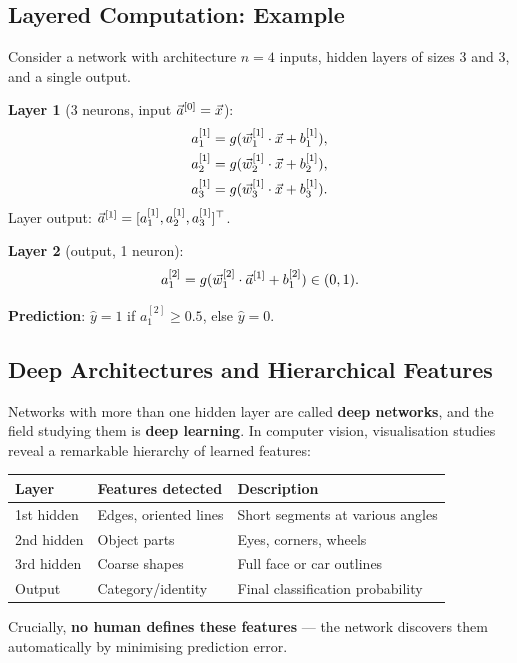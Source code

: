 \subsection{Layered Computation: Example}

Consider a network with architecture $n=4$ inputs, hidden layers of sizes 3
and 3, and a single output.

\textbf{Layer 1} (3 neurons, input $\vec{a}^{[0]}=\vec{x}$):
\begin{align*}
a_1^{[1]}&=g(\vec{w}_1^{[1]}\cdot\vec{x}+b_1^{[1]}),\\
a_2^{[1]}&=g(\vec{w}_2^{[1]}\cdot\vec{x}+b_2^{[1]}),\\
a_3^{[1]}&=g(\vec{w}_3^{[1]}\cdot\vec{x}+b_3^{[1]}).
\end{align*}
Layer output: $\vec{a}^{[1]}=[a_1^{[1]},a_2^{[1]},a_3^{[1]}]^{\top}$.

\textbf{Layer 2} (output, 1 neuron):
\[a_1^{[2]}=g(\vec{w}_1^{[2]}\cdot\vec{a}^{[1]}+b_1^{[2]})\in(0,1).\]

\textbf{Prediction}: $\hat{y}=1$ if $a_1^{[2]}\ge 0.5$, else $\hat{y}=0$.

\subsection{Deep Architectures and Hierarchical Features}

Networks with more than one hidden layer are called \textbf{deep networks},
and the field studying them is \textbf{deep learning}. In computer vision,
visualisation studies reveal a remarkable hierarchy of learned features:

\begin{center}
\begin{tabular}{lll}
\toprule
\textbf{Layer} & \textbf{Features detected} & \textbf{Description}\\
\midrule
1st hidden & Edges, oriented lines & Short segments at various angles\\
2nd hidden & Object parts & Eyes, corners, wheels\\
3rd hidden & Coarse shapes & Full face or car outlines\\
Output     & Category/identity & Final classification probability\\
\bottomrule
\end{tabular}
\end{center}

Crucially, \textbf{no human defines these features} — the network discovers
them automatically by minimising prediction error.

